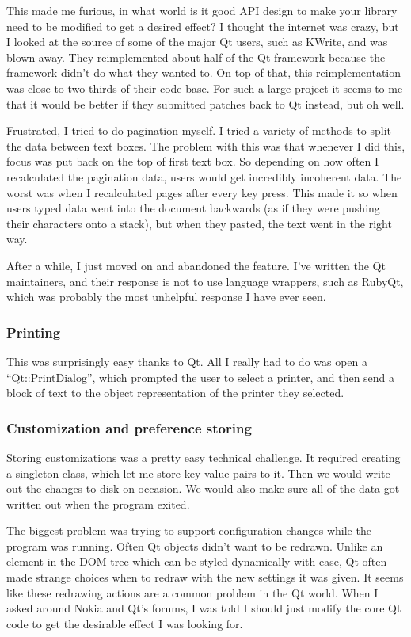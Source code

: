 \documentclass[10pt]{article}
\begin{document}
This made me furious, in what world is it good API design to make your library need to be modified to get a desired effect? I thought the internet was crazy, but I looked at the source of some of the major Qt users, such as KWrite, and was blown away. They reimplemented about half of the Qt framework because the framework didn't do what they wanted to. On top of that, this reimplementation was close to two thirds of their code base. For such a large project it seems to me that it would be better if they submitted patches back to Qt instead, but oh well.

Frustrated, I tried to do pagination myself. I tried a variety of methods to split the data between text boxes. The problem with this was that whenever I did this, focus was put back on the top of first text box. So depending on how often I recalculated the pagination data, users would get incredibly incoherent data. The worst was when I recalculated pages after every key press. This made it so when users typed data went into the document backwards (as if they were pushing their characters onto a stack), but when they pasted, the text went in the right way.

After a while, I just moved on and abandoned the feature. I've written the Qt maintainers, and their response is not to use language wrappers, such as RubyQt, which was probably the most unhelpful response I have ever seen.

\subsubsection{Printing}

This was surprisingly easy thanks to Qt. All I really had to do was open a ``Qt::PrintDialog'', which prompted the user to select a printer, and then send a block of text to the object representation of the printer they selected.

\subsubsection{Customization and preference storing}

Storing customizations was a pretty easy technical challenge. It required creating a singleton class, which let me store key value pairs to it. Then we would write out the changes to disk on occasion. We would also make sure all of the data got written out when the program exited.

The biggest problem was trying to support configuration changes while the program was running. Often Qt objects didn't want to be redrawn. Unlike an element in the DOM tree which can be styled dynamically with ease, Qt often made strange choices when to redraw with the new settings it was given. It seems like these redrawing actions are a common problem in the Qt world. When I asked around Nokia and Qt's forums, I was told I should just modify the core Qt code to get the desirable effect I was looking for.
\end{document}
